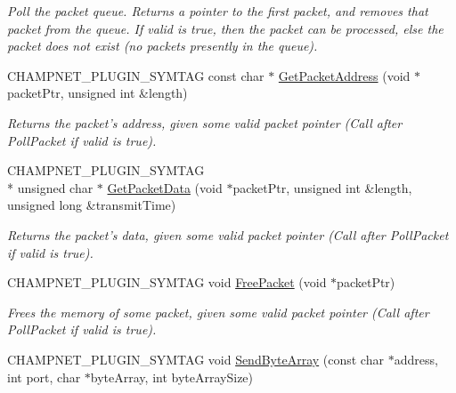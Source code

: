 \begin{DoxyCompactItemize}
\begin{DoxyCompactList}\small\item\em Poll the packet queue. Returns a pointer to the first packet, and removes that packet from the queue. If valid is true, then the packet can be processed, else the packet does not exist (no packets presently in the queue). \end{DoxyCompactList}\item 
\hypertarget{namespace_champ_net_plugin_aeada1879c38a3ec33c57b15ba63fa53d}{C\-H\-A\-M\-P\-N\-E\-T\-\_\-\-P\-L\-U\-G\-I\-N\-\_\-\-S\-Y\-M\-T\-A\-G const char $\ast$ \hyperlink{namespace_champ_net_plugin_aeada1879c38a3ec33c57b15ba63fa53d}{Get\-Packet\-Address} (void $\ast$packet\-Ptr, unsigned int \&length)}\label{namespace_champ_net_plugin_aeada1879c38a3ec33c57b15ba63fa53d}

\begin{DoxyCompactList}\small\item\em Returns the packet's address, given some valid packet pointer (Call after Poll\-Packet if valid is true). \end{DoxyCompactList}\item 
\hypertarget{namespace_champ_net_plugin_acd1de52a8a043992fd80521d459ba977}{C\-H\-A\-M\-P\-N\-E\-T\-\_\-\-P\-L\-U\-G\-I\-N\-\_\-\-S\-Y\-M\-T\-A\-G \\*
unsigned char $\ast$ \hyperlink{namespace_champ_net_plugin_acd1de52a8a043992fd80521d459ba977}{Get\-Packet\-Data} (void $\ast$packet\-Ptr, unsigned int \&length, unsigned long \&transmit\-Time)}\label{namespace_champ_net_plugin_acd1de52a8a043992fd80521d459ba977}

\begin{DoxyCompactList}\small\item\em Returns the packet's data, given some valid packet pointer (Call after Poll\-Packet if valid is true). \end{DoxyCompactList}\item 
\hypertarget{namespace_champ_net_plugin_a713f269ee3388251cca3c05b331bcb77}{C\-H\-A\-M\-P\-N\-E\-T\-\_\-\-P\-L\-U\-G\-I\-N\-\_\-\-S\-Y\-M\-T\-A\-G void \hyperlink{namespace_champ_net_plugin_a713f269ee3388251cca3c05b331bcb77}{Free\-Packet} (void $\ast$packet\-Ptr)}\label{namespace_champ_net_plugin_a713f269ee3388251cca3c05b331bcb77}

\begin{DoxyCompactList}\small\item\em Frees the memory of some packet, given some valid packet pointer (Call after Poll\-Packet if valid is true). \end{DoxyCompactList}\item 
\hypertarget{namespace_champ_net_plugin_aa200f86d409d3024b59ff9398b531797}{C\-H\-A\-M\-P\-N\-E\-T\-\_\-\-P\-L\-U\-G\-I\-N\-\_\-\-S\-Y\-M\-T\-A\-G void \hyperlink{namespace_champ_net_plugin_aa200f86d409d3024b59ff9398b531797}{Send\-Byte\-Array} (const char $\ast$address, int port, char $\ast$byte\-Array, int byte\-Array\-Size)}\label{namespace_champ_net_plugin_aa200f86d409d3024b59ff9398b531797}


\end{DoxyCompactItemize}
